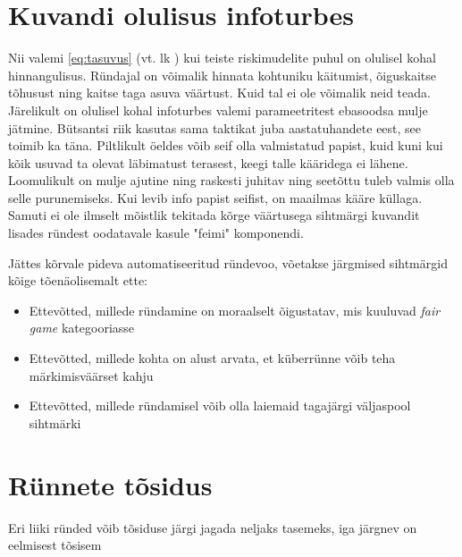 \documentclass{tufte-book}
\begin{document}
\section{Kuvandi olulisus infoturbes}
Nii valemi \ref{eq:tasuvus} (vt. lk \pageref{eq:tasuvus}) kui teiste riskimudelite puhul on olulisel kohal hinnangulisus. Ründajal on võimalik hinnata kohtuniku käitumist, õiguskaitse tõhusust ning kaitse taga asuva väärtust. Kuid tal ei ole võimalik neid teada. Järelikult on olulisel kohal infoturbes valemi parameetritest ebasoodsa mulje jätmine. Bütsantsi riik kasutas sama taktikat juba aastatuhandete eest, see toimib ka täna. Piltlikult öeldes võib seif olla valmistatud papist, kuid kuni kui kõik usuvad ta olevat läbimatust terasest, keegi talle kääridega ei lähene. Loomulikult on mulje ajutine ning raskesti juhitav ning seetõttu tuleb valmis olla selle purunemiseks. Kui levib info papist seifist, on maailmas kääre küllaga. Samuti ei ole ilmselt mõistlik tekitada kõrge väärtusega sihtmärgi kuvandit lisades ründest oodatavale kasule "feimi" komponendi. 

Jättes kõrvale pideva automatiseeritud ründevoo, võetakse järgmised sihtmärgid kõige tõenäolisemalt ette:
\begin{itemize}
	\item Ettevõtted, millede ründamine on moraalselt õigustatav, mis kuuluvad \emph{fair game} kategooriasse
	\item Ettevõtted, millede kohta on alust arvata, et küberrünne võib teha märkimisväärset kahju
	\item Ettevõtted, millede ründamisel võib olla laiemaid tagajärgi väljaspool sihtmärki
\end{itemize}

\section{Rünnete tõsidus}
Eri liiki ründed võib tõsiduse järgi jagada neljaks tasemeks, iga järgnev on eelmisest tõsisem
\end{document}

